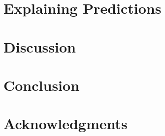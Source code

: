 \documentclass[12pt]{report}
\begin{document}
\chapter{Explaining Predictions}


\chapter{Discussion}


\chapter{Conclusion}




\chapter*{Acknowledgments}







\appendix
\chapter{}



%
\end{document}
